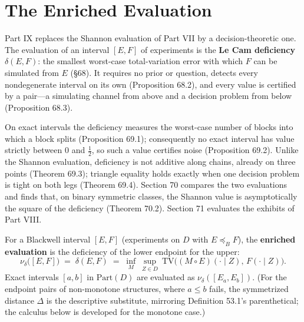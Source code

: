 \part{The Enriched Evaluation}


Part IX replaces the Shannon evaluation of Part VII by a decision-theoretic one. The evaluation of an interval \([E,F]\) of experiments is the \textbf{Le Cam deficiency} \(\delta(E,F)\): the smallest worst-case total-variation error with which \(F\) can be simulated from \(E\) (§68). It requires no prior or question, detects every nondegenerate interval on its own (Proposition 68.2), and every value is certified by a pair---\hspace{0pt}a simulating channel from above and a decision problem from below (Proposition 68.3).

On exact intervals the deficiency measures the worst-case number of blocks into which a block splits (Proposition 69.1); consequently no exact interval has value strictly between \(0\) and \(\tfrac12\), so such a value certifies noise (Proposition 69.2). Unlike the Shannon evaluation, deficiency is not additive along chains, already on three points (Theorem 69.3); triangle equality holds exactly when one decision problem is tight on both legs (Theorem 69.4). Section 70 compares the two evaluations and finds that, on binary symmetric classes, the Shannon value is asymptotically the square of the deficiency (Theorem 70.2). Section 71 evaluates the exhibits of Part VIII.


\begin{thmdef}

For a Blackwell interval \([E, F]\) (experiments on \(D\) with \(E \preceq_B F\)), the \textbf{enriched evaluation} is the deficiency of the lower endpoint for the upper:
\[
\nu_\delta\big([E, F]\big) \;=\; \delta(E, F) \;=\; \inf_M \ \sup_{Z \in D}\ \mathrm{TV}\big((M \circ E)(\cdot \mid Z),\, F(\cdot \mid Z)\big).
\]
Exact intervals \([a, b]\) in \(\mathrm{Part}(D)\) are evaluated as \(\nu_\delta([E_a, E_b])\). (For the endpoint pairs of non-monotone structures, where \(a \le b\) fails, the symmetrized distance \(\Delta\) is the descriptive substitute, mirroring Definition 53.1's parenthetical; the calculus below is developed for the monotone case.)
\end{thmdef}

